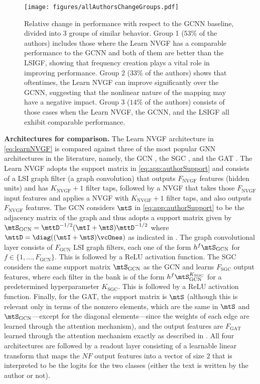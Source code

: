 \begin{figure*}
    \centering
    \texttt{[image: figures/allAuthorsChangeGroups.pdf]}
    \caption{Relative change in performance with respect to the GCNN baseline, divided into $3$ groups of similar behavior. Group 1 ($53\%$ of the authors) includes those where the Learn NVGF has a comparable performance to the GCNN and both of them are better than the LSIGF, showing that frequency creation plays a vital role in improving performance. Group 2 ($33\%$ of the authors) shows that oftentimes, the Learn NVGF can improve significantly over the GCNN, suggesting that the nonlinear nature of the mapping may have a negative impact. Group 3 ($14\%$ of the authors) consists of those cases when the Learn NVGF, the GCNN, and the LSIGF all exhibit comparable performance.}
    \label{fig:app:allAuthors:change}
\end{figure*}

\textbf{Architectures for comparison.} The Learn NVGF architecture in \eqref{eq:learnNVGF} is compared against three of the most popular GNN architectures in the literature, namely, the GCN \cite{Kipf2017-GCN}, the SGC \cite{Weinberger2019-SGC}, and the GAT \cite{Velickovic2018-GAT}. The Learn NVGF adopts the support matrix in \eqref{eq:app:authorSupport} and consists of a LSI graph filter (a graph convolution) that outputs $F_{\text{NVGF}}$ features (hidden units) and has $K_{\text{NVGF}}+1$ filter taps, followed by a NVGF that takes those $F_{\text{NVGF}}$ input features and applies a NVGF with $K_{\text{NVGF}}+1$ filter taps, and also outputs $F_{\text{NVGF}}$ features. The GCN considers $\mtS$ in \eqref{eq:app:authorSupport} to be the adjacency matrix of the graph and thus adopts a support matrix given by $\mtS_{\text{GCN}} = \mttD^{-1/2}(\mtI + \mtS) \mttD^{-1/2}$ where $\mttD = \diag((\mtI+\mtS) \vcOnes)$ as indicated in \cite{Kipf2017-GCN}. The graph convolutional layer consists of $F_{\text{GCN}}$ LSI graph filters, each one of the form $h^{f}\mtS_{\text{GCN}}$ for $f\in\{1,\ldots,F_{\text{GCN}}\}$. This is followed by a ReLU activation function. The SGC considers the same support matrix $\mtS_{\text{GCN}}$ as the GCN and learns $F_{\text{SGC}}$ output features, where each filter in the bank is of the form $h^{f} \mtS_{\text{GCN}}^{K_{\text{SGC}}}$ for a predetermined hyperparameter $K_{\text{SGC}}$. This is followed by a ReLU activation function. Finally, for the GAT, the support matrix is $\mtS$ (although this is relevant only in terms of the nonzero elements, which are the same in $\mtS$ and $\mtS_{\text{GCN}}$---except for the diagonal elements---since the weights of each edge are learned through the attention mechanism), and the output features are $F_{\text{GAT}}$ learned through the attention mechanism exactly as described in \cite{Velickovic2018-GAT}. All four architectures are followed by a readout layer consisting of a learnable linear transform that maps the $NF$ output features into a vector of size $2$ that is interpreted to be the logits for the two classes (either the text is written by the author or not).

